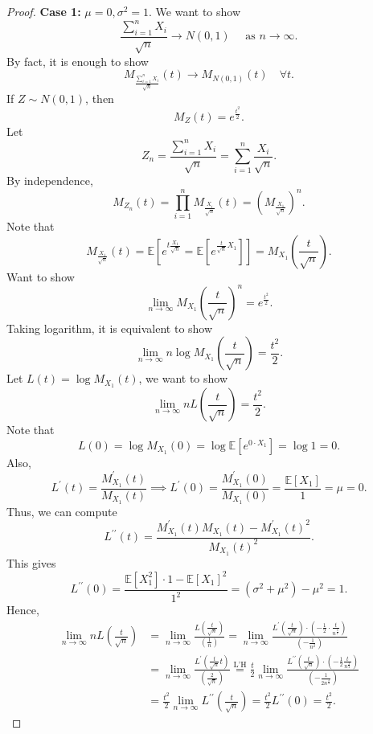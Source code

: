 \begin{proof}
    \textbf{Case 1:} \(\mu = 0, \sigma ^2 = 1\). We want to show 
    \[
        \frac{\sum_{i=1}^n X_i}{\sqrt{n}} \to N(0, 1) \quad \text{ as } n \to \infty. 
    \]  
    By fact, it is enough to show 
    \[
        M_{\frac{\sum_{i=1}^n X_i }{\sqrt{n} }} (t) \to M_{N(0, 1)}(t) \quad \forall t.
    \]
    If \(Z \sim N(0, 1) \), then 
    \[
        M_Z(t) = e^{\frac{t^2}{2}}.
    \] 
    Let
    \[
        Z_n = \frac{\sum_{i=1}^n X_i }{\sqrt{n} } = \sum_{i=1}^n \frac{X_i}{\sqrt{n} }. 
    \]
    By independence,
    \[
        M_{Z_n}(t) = \prod_{i=1}^n M_{\frac{X_i}{\sqrt{n} }}(t) = \left( M_{\frac{X_1}{\sqrt{n} }} \right)^n. 
    \]
    Note that
    \[
        M_{\frac{X_1}{\sqrt{n} }} (t) = \mathbb{E} \left[ e^{t \frac{X_1}{\sqrt{n} }} = \mathbb{E} \left[ e^{\frac{t}{\sqrt{n}} X_1} \right]  \right] = M_{X_1} \left( \frac{t}{\sqrt{n} } \right).  
    \]
    Want to show 
    \[
        \lim_{n \to \infty} M_{X_1} \left( \frac{t}{\sqrt{n} } \right)^n = e^{\frac{t^2}{2}}.  
    \]
    Taking logarithm, it is equivalent to show 
    \[
        \lim_{n \to \infty} n \log M_{X_1} \left( \frac{t}{\sqrt{n} } \right) = \frac{t^2}{2}. 
    \]
    Let \(L(t) = \log M_{X_1}(t)\), we want to show 
    \[
        \lim_{n \to \infty} n L \left( \frac{t}{\sqrt{n} } \right) = \frac{t^2}{2}.  
    \] 
    Note that 
    \[
        L(0) = \log M_{X_1}(0) = \log \mathbb{E} \left[ e^{0 \cdot X_1} \right] = \log 1 = 0. 
    \]
    Also,
    \[
        L^{\prime} (t) = \frac{M_{X_1}^{\prime} (t)}{M_{X_1}(t)} \implies L^{\prime} (0) = \frac{M_{X_1}^{\prime} (0)}{M_{X_1}(0)} = \frac{\mathbb{E} [X_1]}{1} = \mu = 0.
    \]
    Thus, we can compute 
    \[
        L^{\prime\prime} (t) = \frac{M_{X_1}^{\prime} (t) M_{X_1}(t) - M_{X_1}^{\prime} (t)^2}{M_{X_1}(t)^2}.
    \]
    This gives 
    \[
        L^{\prime\prime} (0) = \frac{\mathbb{E} [X_1^2] \cdot 1 - \mathbb{E} [X_1]^2}{1^2} = \left( \sigma ^2 + \mu ^2 \right) - \mu ^2 = 1. 
    \]
    Hence,
    \begin{align*}
        \lim_{n \to \infty} n L \left( \frac{t}{\sqrt{n} } \right) &= \lim_{n \to \infty} \frac{L \left( \frac{t}{\sqrt{n} } \right) }{\left( \frac{1}{n} \right) } = \lim_{n \to \infty} \frac{L^{\prime} \left( \frac{t}{\sqrt{n} } \right) \cdot \left( -\frac{1}{2} \cdot \frac{t}{n^{\frac{3}{2}} } \right) }{\left( -\frac{1}{n^2} \right) } \\
        &= \lim_{n \to \infty} \frac{L^{\prime} \left( \frac{t}{\sqrt{n} } t \right) }{\left( \frac{2}{\sqrt{n} } \right) } \overset{\text{L'H}}{=} \frac{t}{2} \lim_{n \to \infty} \frac{L^{\prime\prime} \left( \frac{t}{\sqrt{n} } \right) \cdot \left( -\frac{1}{2} \frac{t}{n^{\frac{3}{2}}} \right)  }{\left( -\frac{1}{2n^{\frac{3}{2}}} \right) } \\
        &= \frac{t^2}{2} \lim_{n \to \infty} L^{\prime\prime} \left( \frac{t}{\sqrt{n} } \right) = \frac{t^2}{2} L^{\prime\prime} (0) = \frac{t^2}{2}.      
    \end{align*}


\end{proof}

